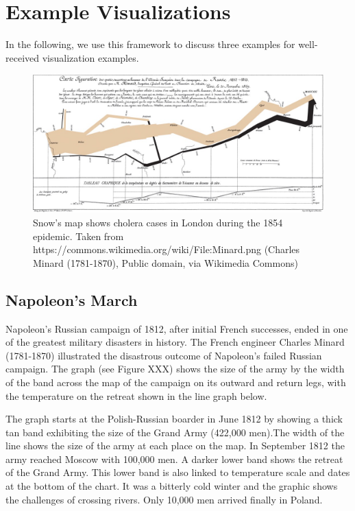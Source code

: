 \documentclass[
]{book}
\begin{document}
\hypertarget{example-visualizations}{%
\section{Example Visualizations}\label{example-visualizations}}

In the following, we use this framework to discuss three examples for well-received visualization examples.

\begin{figure}

{\centering \includegraphics[width=0.75\linewidth]{images/minard-napoleon-march} 

}

\caption{Snow's map shows cholera cases in London during the 1854 epidemic. Taken from https://commons.wikimedia.org/wiki/File:Minard.png (Charles Minard (1781-1870), Public domain, via Wikimedia Commons)}\label{fig:unnamed-chunk-1}
\end{figure}

\hypertarget{napoleons-march}{%
\subsection{Napoleon's March}\label{napoleons-march}}

Napoleon's Russian campaign of 1812, after initial French successes, ended in one of the greatest military disasters in history. The French engineer Charles Minard (1781-1870) illustrated the disastrous outcome of Napoleon's failed Russian campaign. The graph (see Figure XXX) shows the size of the army by the width of the band across the map of the campaign on its outward and return legs, with the temperature on the retreat shown in the line graph below.

The graph starts at the Polish-Russian boarder in June 1812 by showing a thick tan band exhibiting the size of the Grand Army (422,000 men).The width of the line shows the size of the army at each place on the map. In September 1812 the army reached Moscow with 100,000 men. A darker lower band shows the retreat of the Grand Army. This lower band is also linked to temperature scale and dates at the bottom of the chart. It was a bitterly cold winter and the graphic shows the challenges of crossing rivers. Only 10,000 men arrived finally in Poland.
\end{document}
